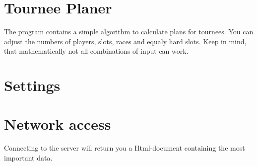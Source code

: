 \documentclass[11pt, a4paper, UKenglish, parskip=half+]{scrbook}
\begin{document}
\section{Tournee Planer}
The program contains a simple algorithm to calculate plans for tournees. You can adjust the numbers of players, slots, races and equaly hard slots. Keep in mind, that mathematically not all combinations of input can work.
\section{Settings}
\section{Network access}
Connecting to the server will return you a Html-document containing the most important data.
\end{document}
